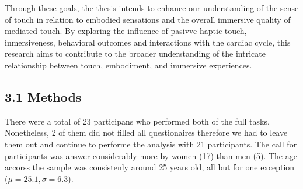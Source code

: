 \documentclass[12pt,oneside,openright]{report}
\begin{document}
Through these goals, the thesis intends to enhance our understanding of the sense of touch in relation to embodied sensations and the overall immersive quality of mediated touch. By exploring the influence of pasivve haptic touch, inmersiveness, behavioral outcomes and interactions with the cardiac cycle, this research aims to contribute to the broader understanding of the intricate relationship between touch, embodiment, and immersive experiences.

\subsection*{3.1 Methods}

There were a total of 23 participans who performed both of the full tasks. Nonetheless, 2 of them did not filled all questionaires therefore we had to leave them out and continue to performe the analysis with 21 participants. The call for participants was answer considerably more by women (17) than men (5). The age accorss the sample was consistenly around 25 years old, all but for one exception ($\mu=25.1 , \sigma=6.3$).
\end{document}
